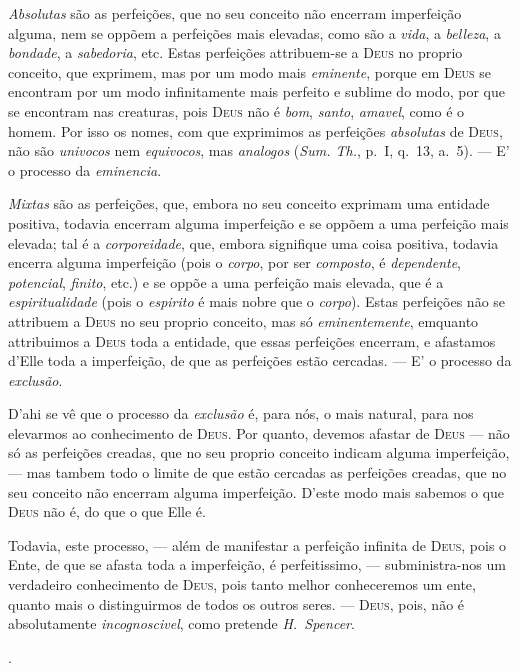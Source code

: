 {\emph{Absolutas} são as perfeições, que no seu conceito não encerram imperfeição alguma,
nem se oppõem a perfeições mais elevadas, como são a \emph{vida}, a \emph{belleza}, a
\emph{bondade}, a \emph{sabedoria}, etc. Estas perfeições attribuem-se a \textsc{Deus} no
proprio conceito, que exprimem, mas por um modo mais \emph{eminente}, porque em
\textsc{Deus} se encontram por um modo infinitamente mais perfeito e sublime do modo, por
que se encontram nas creaturas, pois \textsc{Deus} não é \emph{bom}, \emph{santo},
\emph{amavel}, como é o homem. Por isso os nomes, com que exprimimos as perfeições
\emph{absolutas} de \textsc{Deus}, não são \emph{univocos} nem \emph{equivocos}, mas
\emph{analogos} (\emph{Sum. Th.}, p.~I, q.~13, a.~5). --- E' o processo da
\emph{eminencia}.

\emph{Mixtas} são as perfeições, que, embora no seu conceito exprimam uma entidade
positiva, todavia encerram alguma imperfeição e se oppõem a uma perfeição mais elevada;
tal é a \emph{corporeidade}, que, embora signifique uma coisa positiva, todavia encerra
alguma imperfeição (pois o \emph{corpo}, por ser \emph{composto}, é \emph{dependente},
\emph{potencial}, \emph{finito}, etc.) e se oppõe a uma perfeição mais elevada, que é a
\emph{espiritualidade} (pois o \emph{espirito} é mais nobre que o \emph{corpo}). Estas
perfeições não se attribuem a \textsc{Deus} no seu proprio conceito, mas só
\emph{eminentemente}, emquanto attribuimos a \textsc{Deus} toda a entidade, que essas
perfeições encerram, e afastamos d'Elle toda a imperfeição, de que as perfeições estão
cercadas. --- E' o processo da \emph{exclusão}.

D'ahi se vê que o processo da \emph{exclusão} é, para nós, o mais natural, para nos
elevarmos ao conhecimento de \textsc{Deus}. Por quanto, devemos afastar de \textsc{Deus}
--- não só as perfeições creadas, que no seu proprio conceito indicam alguma imperfeição,
--- mas tambem todo o limite de que estão cercadas as perfeições creadas, que no seu
conceito não encerram alguma imperfeição. D'este modo mais sabemos o que \textsc{Deus}
não é, do que o que Elle é.

Todavia, este processo, --- além de manifestar a perfeição infinita de \textsc{Deus}, pois
o Ente, de que se afasta toda a imperfeição, é perfeitissimo, --- subministra-nos um
verdadeiro conhecimento de \textsc{Deus}, pois tanto melhor conheceremos um ente, quanto
mais o distinguirmos de todos os outros seres. --- \textsc{Deus}, pois, não é
absolutamente \emph{incognoscivel}, como pretende \emph{H.~Spencer}.}.

